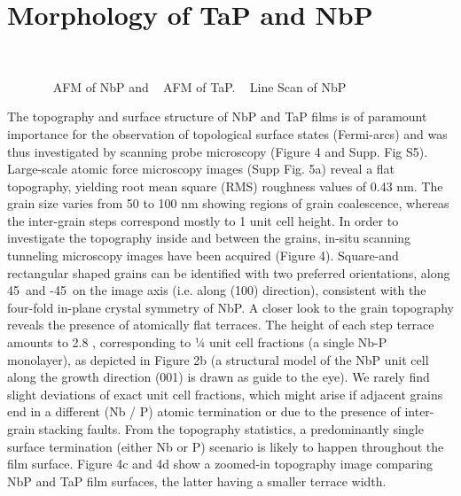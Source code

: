 \section{Morphology of TaP and NbP}

\begin{figure}
    \centering
    \\
    \caption{
        \sfA~ AFM of NbP and 
        \sfB~ AFM of TaP.
        \sfC~ Line Scan of NbP
    }
\end{figure}

The topography and surface structure of NbP and TaP films is of paramount
importance for the observation of topological surface states (Fermi-arcs) 
and was thus investigated by scanning probe microscopy (Figure 4 and Supp. Fig S5).  
Large-scale atomic force microscopy images (Supp Fig. 5a) reveal a flat topography, 
yielding root mean square (RMS) roughness values of 0.43 nm. The grain size varies 
from 50 to 100 nm showing regions of grain coalescence, whereas the inter-grain steps 
correspond mostly to 1 unit cell height.  In order to investigate the topography inside 
and between the grains, in-situ scanning tunneling microscopy images have been acquired 
(Figure 4). Square-and rectangular shaped grains can be identified with two preferred 
orientations, along 45\degree\ and -45\degree\ on the image axis (i.e. along (100) direction), consistent 
with the four-fold in-plane crystal symmetry of NbP. A closer look to the grain topography 
reveals the presence of atomically flat terraces. The height of each step terrace amounts to 
2.8 \angstrom, corresponding to ¼ unit cell fractions (a single Nb-P monolayer), 
as depicted in Figure 2b (a structural model of the NbP unit cell along the growth 
direction (001) is drawn as guide to the eye). We rarely find slight deviations of 
exact unit cell fractions, which might arise if adjacent grains end in a different 
(Nb / P) atomic termination or due to the presence of inter-grain stacking faults. 
From the topography statistics, a predominantly single surface termination (either Nb or P)
scenario is likely to happen throughout the film surface. Figure 4c and 4d show a 
zoomed-in topography image comparing NbP and TaP film surfaces, the latter having a 
smaller terrace width.


